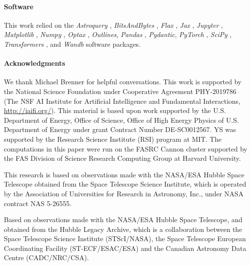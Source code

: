 \documentclass[10pt]{article} %
\newcommand{\package}[1]{\textsl{#1}\xspace}
\begin{document}
\paragraph*{Software}

This work relied on the \package{Astroquery} \citep{2019AJ....157...98G}, \package{BitsAndBytes} \citep{dettmers2022llmint8}, \package{Flax} \citep{flax2020github}, \package{Jax} \citep{jax2018github}, \package{Jupyter} \citep{Kluyver2016jupyter}, \package{Matplotlib} \citep{Hunter:2007}, \package{Numpy} \citep{harris2020array}, \package{Optax} \citep{deepmind2020jax}, \package{Outlines}, \package{Pandas} \citep{2020SciPy-NMeth}, \package{Pydantic}, \package{PyTorch} \citep{paszke2019pytorch}, \package{SciPy} \citep{2020SciPy-NMeth}, \package{Transformers} \citep{wolf2019huggingface}, and \package{Wandb} \citep{wandb} software packages.



\paragraph*{Acknowledgments}

We thank Michael Brenner for helpful conversations.
%
This work is supported by the National Science Foundation under Cooperative Agreement PHY-2019786 (The NSF AI Institute for Artificial Intelligence and Fundamental Interactions, \url{http://iaifi.org/}).
%
This material is based upon work supported by the U.S. Department of Energy, Office of Science, Office of High Energy Physics of U.S. Department of Energy under grant Contract Number  DE-SC0012567. 
%
YS was supported by the Research Science Institute (RSI) program at MIT.
%
The computations in this paper were run on the FASRC Cannon cluster supported by the FAS Division of Science Research Computing Group at Harvard University.

This research is based on observations made with the NASA/ESA Hubble Space Telescope obtained from the Space Telescope Science Institute, which is operated by the Association of Universities for Research in Astronomy, Inc., under NASA contract NAS 5-26555.

Based on observations made with the NASA/ESA Hubble Space Telescope, and obtained from the Hubble Legacy Archive, which is a collaboration between the Space Telescope Science Institute (STScI/NASA), the Space Telescope European Coordinating Facility (ST-ECF/ESAC/ESA) and the Canadian Astronomy Data Centre (CADC/NRC/CSA).
\end{document}
